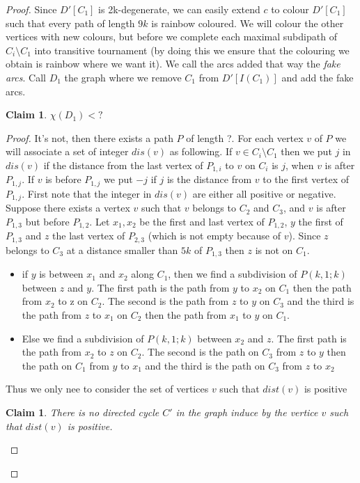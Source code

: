 \documentclass[10pt]{article}
\theoremstyle{plain}
\newtheorem{claim}[theorem]{Claim}
\theoremstyle{definition}
\theoremstyle{remark}
\begin{document}
\begin{proof}
Since $D'[C_1]$ is 2k-degenerate, we can easily extend $c$ to colour $D'[C_1]$ such that every path of length $9k$ is rainbow coloured. 
We will colour the other vertices with  new colours, but before we complete each maximal
subdipath of $C_i \setminus C_1$ into transitive tournament
(by doing this we ensure that the colouring we obtain is rainbow where we want it). We call the arcs added that way the \textit{fake arcs}.  
Call $D_1$ the graph where we remove $C_1$ from $D'[I(C_1)]$ and add the fake arcs.

\begin{claim}
$\chi(D_1) < ?$ 
\end{claim}

\begin{proof}
It's not, then there exists a path $P$ of length ?. 
For each vertex $v$ of $P$ we will associate a set of integer $dis(v)$ as following. 
If $v \in C_i \setminus C_1$ then we put $j$ in $dis(v)$ if the distance
from the last vertex of $P_{1,i}$ to $v$ on $C_i$ is $j$, when $v$ is after $P_{1,j}$. 
If $v$ is before $P_{1,j}$ we put $-j$ if $j$ is the distance from $v$ to the first vertex of $P_{1,j}$. 
First note that the integer in $dis(v)$ are either all positive or negative. Suppose there exists a vertex 
$v$ such that $v$ belongs to $C_2$ and $C_3$, and $v$ is after $P_{1,3}$ but before $P_{1,2}$.
Let $x_1, x_2$ be the first and last vertex of $P_{1,2}$, $y$ the first of $P_{1,3}$ and $z$ the last vertex of $P_{2,3}$
(which is not empty because of $v$). Since $z$ belongs to $C_3$ at a distance smaller than $5k$ of $P_{1,3}$
then $z$ is not on $C_1$. 
\begin{itemize}
	\item if $y$ is between $x_1$ and $x_2$ along $C_1$, then we find a subdivision of $P(k,1;k)$	
	between $z$ and $y$. The first path is the path from $y$ to $x_2$ on $C_1$ then the path from
	$x_2$ to z on $C_2$. The second is the path from $z$ to $y$ on $C_3$ and the third is the path 
	from $z$ to $x_1$ on $C_2$ then the path from $x_1$ to $y$ on $C_1$.
	\item Else we find a subdivision of $P(k,1;k)$ between $x_2$ and $z$. The first path is the path from $x_2$
	to $z$ on $C_2$. The second is the path on $C_3$ from $z$ to $y$ then the path on $C_1$ from $y$ to $x_1$ 
	and the third is the path on $C_3$ from $z$ to $x_2$
	
\end{itemize}
Thus we only nee to consider the set of vertices $v$ such that $dist(v)$ is positive
\begin{claim}\label{CycleDis}
There is no directed cycle $C'$ in the graph induce by the vertice $v$ such that $dist(v)$ is positive.
\end{claim}


\end{proof}
\end{proof}
\end{document}
